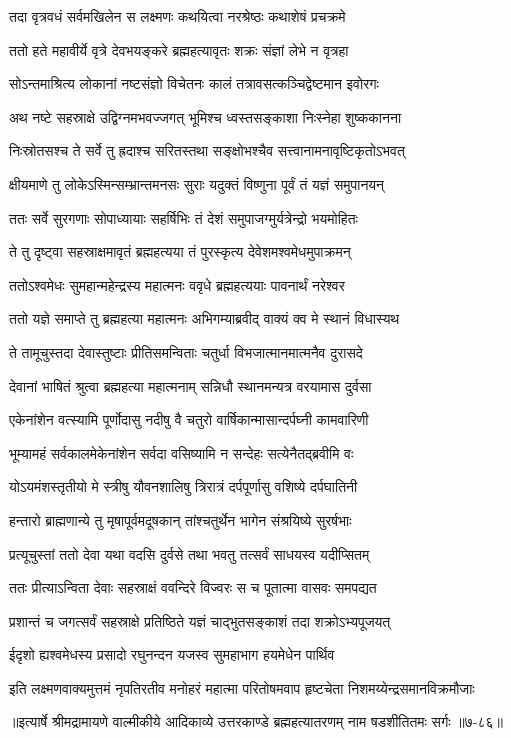 
\twolineshloka
{तदा वृत्रवधं सर्वमखिलेन स लक्ष्मणः}
{कथयित्वा नरश्रेष्ठः कथाशेषं प्रचक्रमे} %

\twolineshloka
{ततो हते महावीर्ये वृत्रे देवभयङ्करे}
{ब्रह्महत्यावृतः शक्रः संज्ञां लेभे न वृत्रहा} %

\twolineshloka
{सोऽन्तमाश्रित्य लोकानां नष्टसंज्ञो विचेतनः}
{कालं तत्रावसत्कञ्चिद्वेष्टमान इवोरगः} %

\twolineshloka
{अथ नष्टे सहस्राक्षे उद्विग्नमभवज्जगत्}
{भूमिश्च ध्वस्तसङ्काशा निःस्नेहा शुष्ककानना} %

\twolineshloka
{निःस्रोतसश्च ते सर्वे तु ह्रदाश्च सरितस्तथा}
{सङ्क्षोभश्चैव सत्त्वानामनावृष्टिकृतोऽभवत्} %

\twolineshloka
{क्षीयमाणे तु लोकेऽस्मिन्सम्भ्रान्तमनसः सुराः}
{यदुक्तं विष्णुना पूर्वं तं यज्ञं समुपानयन्} %

\twolineshloka
{ततः सर्वे सुरगणाः सोपाध्यायाः सहर्षिभिः}
{तं देशं समुपाजग्मुर्यत्रेन्द्रो भयमोहितः} %

\twolineshloka
{ते तु दृष्ट्वा सहस्राक्षमावृतं ब्रह्महत्यया}
{तं पुरस्कृत्य देवेशमश्वमेधमुपाक्रमन्} %

\twolineshloka
{ततोऽश्वमेधः सुमहान्महेन्द्रस्य महात्मनः}
{ववृधे ब्रह्महत्ययाः पावनार्थं नरेश्वर} %

\twolineshloka
{ततो यज्ञे समाप्ते तु ब्रह्महत्या महात्मनः}
{अभिगम्याब्रवीद् वाक्यं क्व मे स्थानं विधास्यथ} %

\twolineshloka
{ते तामूचुस्तदा देवास्तुष्टाः प्रीतिसमन्विताः}
{चतुर्धा विभजात्मानमात्मनैव दुरासदे} %

\twolineshloka
{देवानां भाषितं श्रुत्वा ब्रह्महत्या महात्मनाम्}
{सन्निधौ स्थानमन्यत्र वरयामास दुर्वसा} %

\twolineshloka
{एकेनांशेन वत्स्यामि पूर्णोदासु नदीषु वै}
{चतुरो वार्षिकान्मासान्दर्पघ्नी कामवारिणी} %

\twolineshloka
{भूम्यामहं सर्वकालमेकेनांशेन सर्वदा}
{वसिष्यामि न सन्देहः सत्येनैतद्ब्रवीमि वः} %

\twolineshloka
{योऽयमंशस्तृतीयो मे स्त्रीषु यौवनशालिषु}
{त्रिरात्रं दर्पपूर्णासु वशिष्ये दर्पघातिनी} %

\twolineshloka
{हन्तारो ब्राह्मणान्ये तु मृषापूर्वमदूषकान्}
{तांश्चतुर्थेन भागेन संश्रयिष्ये सुरर्षभाः} %

\twolineshloka
{प्रत्यूचुस्तां ततो देवा यथा वदसि दुर्वसे}
{तथा भवतु तत्सर्वं साधयस्व यदीप्सितम्} %

\twolineshloka
{ततः प्रीत्याऽन्विता देवाः सहस्राक्षं ववन्दिरे}
{विज्वरः स च पूतात्मा वासवः समपद्यत} %

\twolineshloka
{प्रशान्तं च जगत्सर्वं सहस्राक्षे प्रतिष्ठिते}
{यज्ञं चाद्भुतसङ्काशं तदा शक्रोऽभ्यपूजयत्} %

\twolineshloka
{ईदृशो ह्यश्वमेधस्य प्रसादो रघुनन्दन}
{यजस्व सुमहाभाग हयमेधेन पार्थिव} %

\twolineshloka
{इति लक्ष्मणवाक्यमुत्तमं नृपतिरतीव मनोहरं महात्मा}
{परितोषमवाप हृष्टचेता निशमय्येन्द्रसमानविक्रमौजाः} %


॥इत्यार्षे श्रीमद्रामायणे वाल्मीकीये आदिकाव्ये उत्तरकाण्डे ब्रह्महत्यातरणम् नाम षडशीतितमः सर्गः ॥७-८६॥
